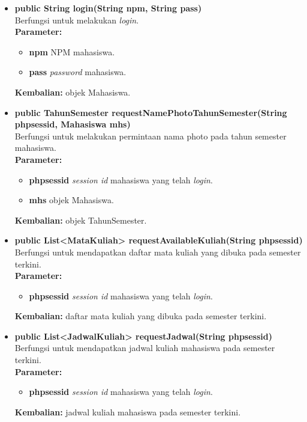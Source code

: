 \begin{enumerate}
\begin{enumerate}
\begin{itemize}
				\item \textbf{public String login(String npm, String pass)}\\
					Berfungsi untuk melakukan \textit{login}.\\
					\textbf{Parameter:}
					\begin{itemize}
						\item \textbf{npm} NPM mahasiswa.
						\item \textbf{pass} \textit{password} mahasiswa.
					\end{itemize}
					\textbf{Kembalian:} objek Mahasiswa.
			
				\item \textbf{public TahunSemester requestNamePhotoTahunSemester(String phpsessid, Mahasiswa mhs)}\\
					Berfungsi untuk melakukan permintaan nama photo pada tahun semester mahasiswa.\\
					\textbf{Parameter:}
					\begin{itemize}
						\item \textbf{phpsessid} \textit{session id} mahasiswa yang telah \textit{login}.
						\item \textbf{mhs} objek Mahasiswa.
					\end{itemize}
					\textbf{Kembalian:} objek TahunSemester.
			
				\item \textbf{public List<MataKuliah> requestAvailableKuliah(String phpsessid)}\\
					Berfungsi untuk mendapatkan daftar mata kuliah yang dibuka pada semester terkini.\\
					\textbf{Parameter:}
					\begin{itemize}
						\item \textbf{phpsessid} \textit{session id} mahasiswa yang telah \textit{login}.
					\end{itemize}
					\textbf{Kembalian:} daftar mata kuliah yang dibuka pada semester terkini.
			
				\item \textbf{public List<JadwalKuliah> requestJadwal(String phpsessid)}\\
					Berfungsi untuk mendapatkan jadwal kuliah mahasiswa pada semester terkini.\\
					\textbf{Parameter:}
					\begin{itemize}
						\item \textbf{phpsessid} \textit{session id} mahasiswa yang telah \textit{login}.
					\end{itemize}
					\textbf{Kembalian:} jadwal kuliah mahasiswa pada semester terkini.
				

\end{itemize}
\end{enumerate}
\end{enumerate}

